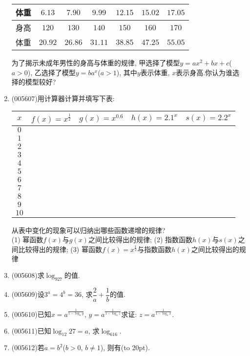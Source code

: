 \documentclass[10pt,a4paper]{article}
\newcommand{\bracket}[1]{(\hbox to #1pt{})}
\begin{document}
\begin{enumerate}[1.]
\begin{center}
\begin{tabular}{|c|c|c|c|c|c|c|}
        体重 & $6.13$ & $7.90$ & $9.99$ & $12.15$ & $15.02$ & $17.05$\\ \hline
        身高 & $120$ & $130$ & $140$ & $150$ & $160$ & $170$\\ \hline
        体重 & $20.92$ & $26.86$ & $31.11$ & $38.85$ & $47.25$ & $55.05$\\ \hline
    \end{tabular}
\end{center}
为了揭示未成年男性的身高与体重的规律, 甲选择了模型$y=ax^2+bx+c$($a>0$), 乙选择了模型$y=ba^x$($a>1$), 其中$y$表示体重, $x$表示身高.你认为谁选择的模型较好?
\item {\tiny (005607)}用计算器计算并填写下表:
\begin{center}
    \begin{tabular}{|c|c|c|c|c|}
        \hline
        $x$	& $f(x)=x^{\frac 12}$ & $g(x)=x^{0.6}$ & $h(x)=2.1^x$ & $s(x)=2.2^x$ \\ \hline
        $0$ & & & & \\ \hline
        $1$ & & & & \\ \hline
        $2$ & & & & \\ \hline
        $3$ & & & & \\ \hline
        $4$ & & & & \\ \hline
        $5$ & & & & \\ \hline
        $6$ & & & & \\ \hline
        $7$ & & & & \\ \hline
        $8$ & & & & \\ \hline
        $9$ & & & & \\ \hline
        $10$ & & & & \\ \hline
    \end{tabular}
\end{center}
从表中变化的现象可以归纳出哪些函数递增的规律?\\
(1) 幂函数$f(x)$与$g(x)$之间比较得出的规律;
(2) 指数函数$h(x)$与$s(x)$之间比较得出的规律;
(3) 幂函数$f(x)=x^{\frac 12}$与指数函数$h(x)$之间比较得出的规律
\item {\tiny (005608)}求$\log_927$的值.
\item {\tiny (005609)}设$3^a=4^b=36$, 求$\dfrac 2a+\dfrac 1b$的值.
\item {\tiny (005610)}已知$x=a^{\frac 1{1-\log_ay}}$, $y=a^{\frac 1{1-\log_az}}$求证: $z=a^{\frac 1{1-\log_ax}}$.
\item {\tiny (005611)}已知$\log_{12}27=a$, 求$\log_616$.
\item {\tiny (005612)}若$a=b^2$($b>0$, $b\ne 1$), 则有\bracket{20}.

\end{enumerate}
\end{document}
